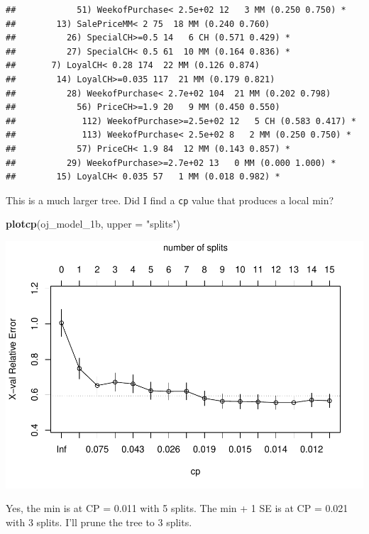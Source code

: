 \documentclass[
]{book}
\newenvironment{Shaded}{\begin{snugshade}}{\end{snugshade}}
\newcommand{\DataTypeTok}[1]{\textcolor[rgb]{0.13,0.29,0.53}{#1}}
\newcommand{\DecValTok}[1]{\textcolor[rgb]{0.00,0.00,0.81}{#1}}
\newcommand{\KeywordTok}[1]{\textcolor[rgb]{0.13,0.29,0.53}{\textbf{#1}}}
\newcommand{\NormalTok}[1]{#1}
\newcommand{\OperatorTok}[1]{\textcolor[rgb]{0.81,0.36,0.00}{\textbf{#1}}}
\newcommand{\OtherTok}[1]{\textcolor[rgb]{0.56,0.35,0.01}{#1}}
\newcommand{\StringTok}[1]{\textcolor[rgb]{0.31,0.60,0.02}{#1}}
\begin{document}
\begin{verbatim}
##            51) WeekofPurchase< 2.5e+02 12   3 MM (0.250 0.750) *
##        13) SalePriceMM< 2 75  18 MM (0.240 0.760)  
##          26) SpecialCH>=0.5 14   6 CH (0.571 0.429) *
##          27) SpecialCH< 0.5 61  10 MM (0.164 0.836) *
##       7) LoyalCH< 0.28 174  22 MM (0.126 0.874)  
##        14) LoyalCH>=0.035 117  21 MM (0.179 0.821)  
##          28) WeekofPurchase< 2.7e+02 104  21 MM (0.202 0.798)  
##            56) PriceCH>=1.9 20   9 MM (0.450 0.550)  
##             112) WeekofPurchase>=2.5e+02 12   5 CH (0.583 0.417) *
##             113) WeekofPurchase< 2.5e+02 8   2 MM (0.250 0.750) *
##            57) PriceCH< 1.9 84  12 MM (0.143 0.857) *
##          29) WeekofPurchase>=2.7e+02 13   0 MM (0.000 1.000) *
##        15) LoyalCH< 0.035 57   1 MM (0.018 0.982) *
\end{verbatim}

This is a much larger tree. Did I find a \texttt{cp} value that produces a local min?

\begin{Shaded}
\begin{Highlighting}[]
\KeywordTok{plotcp}\NormalTok{(oj_model_1b, }\DataTypeTok{upper =} \StringTok{"splits"}\NormalTok{)}
\end{Highlighting}
\end{Shaded}

\includegraphics{data-sci_files/figure-latex/unnamed-chunk-66-1.pdf}

Yes, the min is at CP = 0.011 with 5 splits. The min + 1 SE is at CP = 0.021 with 3 splits. I'll prune the tree to 3 splits.

\begin{Shaded}
\end{Shaded}
\end{document}
